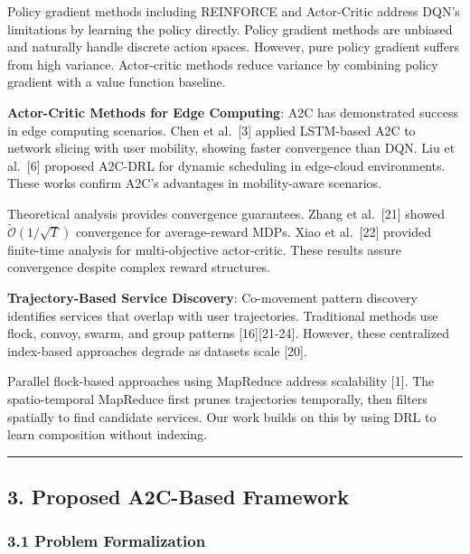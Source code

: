 \documentclass[
  10pt,
  twocolumn,
]{article}
\begin{document}
Policy gradient methods including REINFORCE and Actor-Critic address
DQN's limitations by learning the policy directly. Policy gradient
methods are unbiased and naturally handle discrete action spaces.
However, pure policy gradient suffers from high variance. Actor-critic
methods reduce variance by combining policy gradient with a value
function baseline.

\textbf{Actor-Critic Methods for Edge Computing}: A2C has demonstrated
success in edge computing scenarios. Chen et al.~{[}3{]} applied
LSTM-based A2C to network slicing with user mobility, showing faster
convergence than DQN. Liu et al.~{[}6{]} proposed A2C-DRL for dynamic
scheduling in edge-cloud environments. These works confirm A2C's
advantages in mobility-aware scenarios.

Theoretical analysis provides convergence guarantees. Zhang et
al.~{[}21{]} showed \(\tilde{\mathcal{O}}(1/\sqrt{T})\) convergence for
average-reward MDPs. Xiao et al.~{[}22{]} provided finite-time analysis
for multi-objective actor-critic. These results assure convergence
despite complex reward structures.

\textbf{Trajectory-Based Service Discovery}: Co-movement pattern
discovery identifies services that overlap with user trajectories.
Traditional methods use flock, convoy, swarm, and group patterns
{[}16{]}{[}21-24{]}. However, these centralized index-based approaches
degrade as datasets scale {[}20{]}.

Parallel flock-based approaches using MapReduce address scalability
{[}1{]}. The spatio-temporal MapReduce first prunes trajectories
temporally, then filters spatially to find candidate services. Our work
builds on this by using DRL to learn composition without indexing.

\begin{center}\rule{0.5\linewidth}{0.5pt}\end{center}

\hypertarget{proposed-a2c-based-framework}{%
	\subsection{3. Proposed A2C-Based
		Framework}\label{proposed-a2c-based-framework}}

\hypertarget{problem-formalization}{%
	\subsubsection{3.1 Problem Formalization}\label{problem-formalization}}
\end{document}
